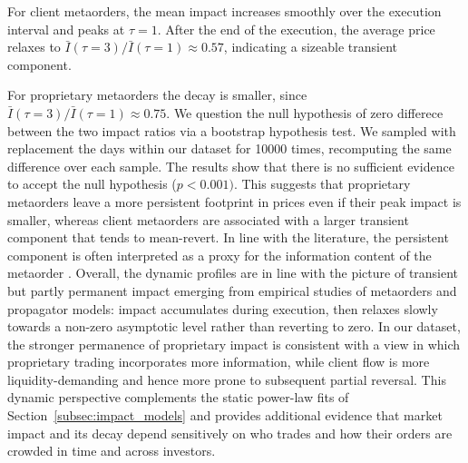\documentclass[11pt]{article}
\begin{document}
For client metaorders, the mean impact increases smoothly over the execution interval and peaks at $\tau = 1$. After the end of the execution, the average price relaxes to $\bar I(\tau{=}3)/\bar I(\tau{=}1)\approx 0.57$, 
indicating a sizeable transient component.

For proprietary metaorders the decay is smaller, since $\bar I(\tau{=}3)/\bar I(\tau{=}1)\approx 0.75$. We question the 
null hypothesis of zero differece between the two impact ratios via a bootstrap hypothesis test. We sampled with 
replacement the days within our dataset for 10000 times, recomputing the same difference over each sample. The results 
show that there is no sufficient evidence to accept the null hypothesis ($p<0.001)$. 
This suggests that proprietary metaorders leave a more persistent footprint in prices even if their peak impact is smaller, 
whereas client metaorders are associated with a larger transient component that tends to mean-revert. In line with the literature, the persistent 
component is often  interpreted as a proxy for the information content of the metaorder \cite{GomesWaelbroeck2015}.
Overall, the dynamic profiles are in line with the picture of transient but partly permanent impact emerging from 
empirical studies of metaorders and propagator models: impact accumulates during execution, then relaxes slowly towards 
a non-zero asymptotic level rather than reverting to
zero.
In our dataset, the stronger permanence of proprietary impact is consistent with a view in which proprietary trading 
incorporates more information, while client flow is more liquidity-demanding and hence more prone to subsequent partial 
reversal. This dynamic perspective complements the static power-law fits of Section~\ref{subsec:impact_models} and provides 
additional evidence that market impact and its decay depend sensitively on who trades and how their orders are crowded in 
time and across investors.
\end{document}
